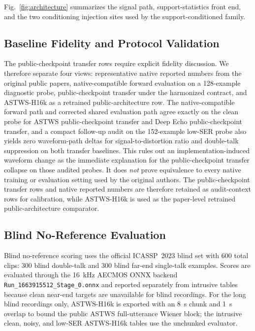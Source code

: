 \documentclass[journal]{IEEEtran}
\begin{document}
Fig.~\ref{fig:architecture} summarizes the signal path, support-statistics front end, and the two conditioning injection sites used by the support-conditioned family.

\subsection{Baseline Fidelity and Protocol Validation}
The public-checkpoint transfer rows require explicit fidelity discussion. We therefore separate four views: representative native reported numbers from the original public papers, native-compatible forward evaluation on a 128-example diagnostic probe, public-checkpoint transfer under the harmonized contract, and ASTWS-H16k as a retrained public-architecture row. The native-compatible forward path and corrected shared evaluation path agree exactly on the clean probe for ASTWS public-checkpoint transfer and Deep Echo public-checkpoint transfer, and a compact follow-up audit on the 152-example low-SER probe also yields zero waveform-path deltas for signal-to-distortion ratio and double-talk suppression on both transfer baselines. This rules out an implementation-induced waveform change as the immediate explanation for the public-checkpoint transfer collapse on those audited probes. It does \emph{not} prove equivalence to every native training or evaluation setting used by the original authors. The public-checkpoint transfer rows and native reported numbers are therefore retained as audit-context rows for calibration, while ASTWS-H16k is used as the paper-level retrained public-architecture comparator.

\subsection{Blind No-Reference Evaluation}
Blind no-reference scoring uses the official ICASSP~2023 blind set with 600 total clips: 300 blind double-talk and 300 blind far-end single-talk examples. Scores are evaluated through the 16~kHz AECMOS ONNX backend \texttt{Run\_1663915512\_Stage\_0.onnx} and reported separately from intrusive tables because clean near-end targets are unavailable for blind recordings. For the long blind recordings only, ASTWS-H16k is exported with an 8~s chunk and 1~s overlap to bound the public ASTWS full-utterance Wiener block; the intrusive clean, noisy, and low-SER ASTWS-H16k tables use the unchunked evaluator.
\end{document}
